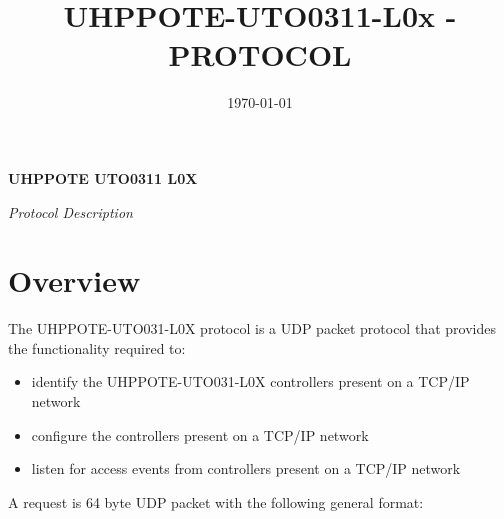 \documentclass[11pt, oneside]{article}
\title{UHPPOTE-UTO0311-L0x - PROTOCOL}
\author{}
\date{\today}
\begin{document}
\thispagestyle{empty}



\clearpage

\setcounter{page}{1}
\renewcommand{\arraystretch}{1.75}
   
\begingroup\centering 
\fontsize{16}{20}
\selectfont
\textbf{UHPPOTE UTO0311 L0X}
\vspace{1cm}

\fontsize{13}{16}
\selectfont
\textit{Protocol Description}
\vspace{0.25cm}

\hrulefill
\endgroup


\section*{Overview}

The UHPPOTE-UTO031-L0X protocol is a UDP packet protocol that provides the functionality required to:

\begin{itemize}  
\item identify the UHPPOTE-UTO031-L0X controllers present on a TCP/IP network
\item configure the controllers present on a TCP/IP network
\item listen for access events from controllers present on a TCP/IP network
\end{itemize}

\textbf{
}

A request is 64 byte UDP packet with the following general format:

{ 
}
\end{document}
